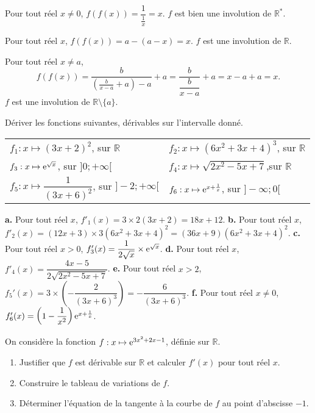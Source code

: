 \documentclass[11pt,fleqn, openany]{book} %
\begin{document}
\begin{solution}
Pour tout réel $x\neq 0$, $f(f(x))=\dfrac{1}{\frac{1}{x}}=x$. $f$ est bien une involution de $\mathbb{R}^*$.

Pour tout réel $x$, $f(f(x))=a-(a-x)=x$. $f$ est une involution de $\mathbb{R}$.

Pour tout réel $x\neq a$,
\[f(f(x))=\dfrac{b}{\left(\frac{b}{x-a}+a\right)-a}+a=\dfrac{b}{\dfrac{b}{x-a}}+a=x-a+a=x.\]
$f$ est une involution de $\mathbb{R}\setminus \{a\}$.\end{solution}




\begin{exercise}Dériver les fonctions suivantes, dérivables sur l'intervalle donné.

\renewcommand{\arraystretch}{2}
\begin{tabularx}{\linewidth}{XX}
 $f_1 : x \mapsto (3x+2)^2$, sur $\mathbb{R}$ &
 $f_2 : x \mapsto (6x^2+3x+4)^3$,  sur $\mathbb{R}$ \\
  $f_3 : x \mapsto \mathrm{e}^{\sqrt{x}}$,  sur $]0;+\infty[$ &
$f_4 : x \mapsto \sqrt{2x^2-5x+7}$,sur $\mathbb{R}$ \\
  $f_5 : x \mapsto \dfrac{1}{(3x+6)^2}$, sur $]-2;+\infty[$ &
$f_6 : x \mapsto \mathrm{e}^{x+\frac{1}{x}}$,  sur $]-\infty;0[$ 
\end{tabularx}\end{exercise}

\begin{solution}\textbf{a.} Pour tout réel $x$, $f'_1(x)=3\times 2 (3x+2)=18x+12$.
\vskip5pt
\textbf{b.} Pour tout réel $x$, $f'_2(x)=(12x+3)\times 3(6x^2+3x+4)^2=(36x+9)(6x^2+3x+4)^2$.
\vskip5pt
\textbf{c.} Pour tout réel $x>0$, $f'_3(x)=\dfrac{1}{2\sqrt{x}}\times \mathrm{e}^{\sqrt{x}}$.
\vskip5pt
\textbf{d.} Pour tout réel $x$, $f'_4(x)=\dfrac{4x-5}{2\sqrt{2x^2-5x+7}}$.
\vskip5pt
\textbf{e.} Pour tout réel $x>2$, $f_5'(x)=3 \times \left(-\dfrac{2}{(3x+6)^3}\right)=-\dfrac{6}{(3x+6)^3}$.
\vskip5pt
\textbf{f.} Pour tout réel $x\neq 0$, $f'_6(x)=\left(1-\dfrac{1}{x^2}\right)\mathrm{e}^{x+\frac{1}{x}}$.\end{solution}




\begin{exercise}On considère la fonction $f:x\mapsto \mathrm{e}^{3x^2+2x-1}$, définie sur $\mathbb{R}$.
\begin{enumerate}
\item Justifier que $f$ est dérivable sur $\mathbb{R}$ et calculer $f'(x)$ pour tout réel $x$.
\item Construire le tableau de variations de $f$.
\item Déterminer l'équation de la tangente à la courbe de $f$ au point d'abscisse $-1$.
\end{enumerate}
\newpage \end{exercise}
\end{document}
